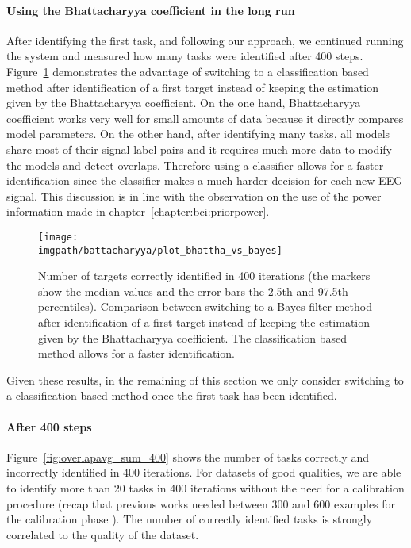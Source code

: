 \paragraph{Using the Bhattacharyya coefficient in the long run}

After identifying the first task, and following our approach, we continued running the system and measured how many tasks were identified after 400 steps. Figure~\ref{fig:overlapbhatta} demonstrates the advantage of switching to a classification based method after identification of a first target instead of keeping the estimation given by the Bhattacharyya coefficient. On the one hand, Bhattacharyya coefficient works very well for small amounts of data because it directly compares model parameters. On the other hand, after identifying many tasks, all models share most of their signal-label pairs and it requires much more data to modify the models and detect overlaps. Therefore using a classifier allows for a faster identification since the classifier makes a much harder decision for each new EEG signal. This discussion is in line with the observation on the use of the power information made in chapter~\ref{chapter:bci:priorpower}.

\begin{figure}[!htbp]
    \centering
        \texttt{[image: \\imgpath/battacharyya/plot\_bhattha\_vs\_bayes]}
        \caption{Number of targets correctly identified in 400 iterations (the markers show the median values and the error bars the 2.5th and 97.5th percentiles). Comparison between switching to a Bayes filter method after identification of a first target instead of keeping the estimation given by the Bhattacharyya coefficient. The classification based method allows for a faster identification.}
        \label{fig:overlapbhatta}
\end{figure} 

Given these results, in the remaining of this section we only consider switching to a classification based method once the first task has been identified.

\paragraph{After 400 steps}

Figure~\ref{fig:overlapavg_sum_400} shows the number of tasks correctly and incorrectly identified in 400 iterations. For datasets of good qualities, we are able to identify more than 20 tasks in 400 iterations without the need for a calibration procedure (recap that previous works needed between 300 and 600 examples for the calibration phase \cite{chavarriaga2010learning,iturrate2010single}). The number of correctly identified tasks is strongly correlated to the quality of the dataset.

